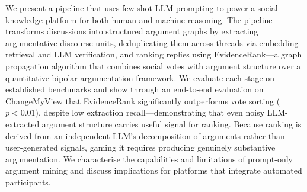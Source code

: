 
We present a pipeline that uses few-shot LLM prompting to power a social knowledge platform for both human and machine reasoning. The pipeline transforms discussions into structured argument graphs by extracting argumentative discourse units, deduplicating them across threads via embedding retrieval and LLM verification, and ranking replies using EvidenceRank---a graph propagation algorithm that combines social votes with argument structure over a quantitative bipolar argumentation framework. We evaluate each stage on established benchmarks and show through an end-to-end evaluation on ChangeMyView that EvidenceRank significantly outperforms vote sorting ($p<0.01$), despite low extraction recall---demonstrating that even noisy LLM-extracted argument structure carries useful signal for ranking. Because ranking is derived from an independent LLM's decomposition of arguments rather than user-generated signals, gaming it requires producing genuinely substantive argumentation. We characterise the capabilities and limitations of prompt-only argument mining and discuss implications for platforms that integrate automated participants.
